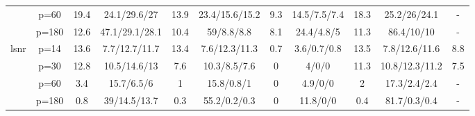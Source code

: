 \begin{table}[ht]
{\begin{tabular}{|c|c|cc|cc|cc|cc|c|}
   & p=60 & 19.4 & 24.1/29.6/27 & 13.9 & 23.4/15.6/15.2 & 9.3 & 14.5/7.5/7.4 & 18.3 & 25.2/26/24.1 & - \\ 
   & p=180 & 12.6 & 47.1/29.1/28.1 & 10.4 & 59/8.8/8.8 & 8.1 & 24.4/4.8/5 & 11.3 & 86.4/10/10 & - \\ 
  \midrule\multirow{4}[2]{*}{lsnr} & p=14 & 13.6 & 7.7/12.7/11.7 & 13.4 & 7.6/12.3/11.3 & 0.7 & 3.6/0.7/0.8 & 13.5 & 7.8/12.6/11.6 & 8.8 \\ 
   & p=30 & 12.8 & 10.5/14.6/13 & 7.6 & 10.3/8.5/7.6 & 0 & 4/0/0 & 11.3 & 10.8/12.3/11.2 & 7.5 \\ 
   & p=60 & 3.4 & 15.7/6.5/6 & 1 & 15.8/0.8/1 & 0 & 4.9/0/0 & 2 & 17.3/2.4/2.4 & - \\ 
   & p=180 & 0.8 & 39/14.5/13.7 & 0.3 & 55.2/0.2/0.3 & 0 & 11.8/0/0 & 0.4 & 81.7/0.3/0.4 & - \\ 
   \bottomrule 
\end{tabular}
}
\end{table}
